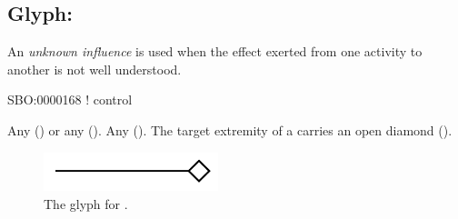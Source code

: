 \subsection{Glyph: }
\label{sec:af:unknown_infl}

An \emph{unknown influence} is used when the effect exerted from one activity to another is not well understood. 

\begin{glyphDescription}

\glyphSboTerm SBO:0000168 ! control

 \glyphOrigin Any  () or any  ().
 \glyphTarget Any  ().
 \glyphEndPoint The target extremity of a  carries an open diamond ().


\end{glyphDescription}

\begin{figure}[H]
  \centering
  \includegraphics[width = 2in]{images/unknownInfluence}
  \caption{The \AF glyph for .}
  \label{fig:af:unknownInfl}
\end{figure}

